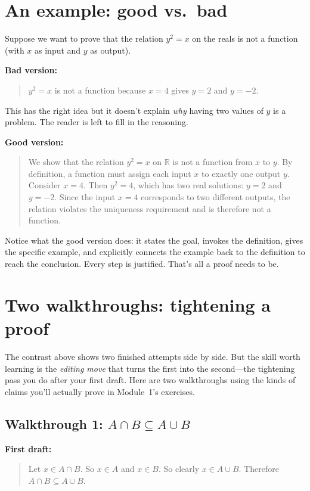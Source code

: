 \documentclass[11pt]{article}
\begin{document}
\section{An example: good vs.\ bad}

Suppose we want to prove that the relation $y^2 = x$ on the reals is not a function (with $x$ as input and $y$ as output).

\medskip
\noindent\textbf{Bad version:}
\begin{quote}
$y^2 = x$ is not a function because $x = 4$ gives $y = 2$ and $y = -2$.
\end{quote}

This has the right idea but it doesn't explain \emph{why} having two values of $y$ is a problem. The reader is left to fill in the reasoning.

\medskip
\noindent\textbf{Good version:}
\begin{quote}
We show that the relation $y^2 = x$ on $\mathbb{R}$ is not a function from $x$ to $y$. By definition, a function must assign each input $x$ to exactly one output $y$. Consider $x = 4$. Then $y^2 = 4$, which has two real solutions: $y = 2$ and $y = -2$. Since the input $x = 4$ corresponds to two different outputs, the relation violates the uniqueness requirement and is therefore not a function.
\end{quote}

Notice what the good version does: it states the goal, invokes the definition, gives the specific example, and explicitly connects the example back to the definition to reach the conclusion. Every step is justified. That's all a proof needs to be.

\section{Two walkthroughs: tightening a proof}

The contrast above shows two finished attempts side by side. But the skill worth learning is the \emph{editing move} that turns the first into the second---the tightening pass you do after your first draft. Here are two walkthroughs using the kinds of claims you'll actually prove in Module~1's exercises.

\subsection*{Walkthrough 1: $A \cap B \subseteq A \cup B$}

\medskip
\noindent\textbf{First draft:}
\begin{quote}
Let $x \in A \cap B$. So $x \in A$ and $x \in B$. So clearly $x \in A \cup B$. Therefore $A \cap B \subseteq A \cup B$.
\end{quote}
\end{document}
